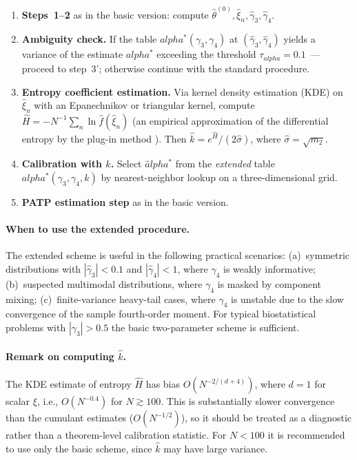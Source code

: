 \documentclass[11pt]{article}
\def\alpha{alpha}%
\theoremstyle{definition}
\begin{document}
\begin{enumerate}
  \item \textbf{Steps~1--2} as in the basic version: compute
        $\hat\theta^{(0)}, \hat\xi_n, \hat\gamma_3, \hat\gamma_4$.
  \item \textbf{Ambiguity check.} If the table
        $\alpha^{*}(\gamma_3, \gamma_4)$ at $(\hat\gamma_3, \hat\gamma_4)$
        yields a variance of the estimate $\alpha^{*}$ exceeding the threshold
        $\tau_{\alpha} = 0.1$~--- proceed to step~3'; otherwise
        continue with the standard procedure.
  \item[3'.] \textbf{Entropy coefficient estimation.}
        Via kernel density estimation (KDE) on $\hat\xi_n$ with an
        Epanechnikov or triangular kernel, compute
        $\hat H = -N^{-1}\sum_n \ln \hat f(\hat\xi_n)$ (an empirical
        approximation of the differential entropy by the plug-in method
        \citep[Ch.~12.4]{coverthomas2006}). Then
        $\hat k = e^{\hat H}/(2 \hat\sigma)$, where
        $\hat\sigma = \sqrt{m_2}$.
  \item[4'.] \textbf{Calibration with $k$.} Select $\hat\alpha^{*}$
        from the \emph{extended} table $\alpha^{*}(\gamma_3, \gamma_4, k)$
        by nearest-neighbor lookup on a three-dimensional grid.
  \item[5'.] \textbf{PATP estimation step} as in the basic version.
\end{enumerate}

\paragraph{When to use the extended procedure.}
The extended scheme is useful in the following practical scenarios:
(a)~symmetric distributions with $|\hat\gamma_3| < 0.1$ and
$|\hat\gamma_4| < 1$, where $\gamma_4$ is weakly informative;
(b)~suspected multimodal distributions, where $\gamma_4$ is masked by
component mixing;
(c)~finite-variance heavy-tail cases, where $\hat\gamma_4$ is unstable due
to the slow convergence of the sample fourth-order moment.
For typical biostatistical problems with $|\gamma_3| > 0.5$ the basic
two-parameter scheme is sufficient.

\paragraph{Remark on computing $\hat k$.}
The KDE estimate of entropy $\hat H$ has bias $O(N^{-2/(d+4)})$, where $d = 1$
for scalar $\xi$, i.e., $O(N^{-0.4})$ for $N \gtrsim 100$. This is
substantially slower convergence than the cumulant estimates
($O(N^{-1/2})$), so it should be treated as a diagnostic rather than a
theorem-level calibration statistic. For $N < 100$ it is recommended to use
only the basic scheme, since $\hat k$ may have large variance.
\end{document}
